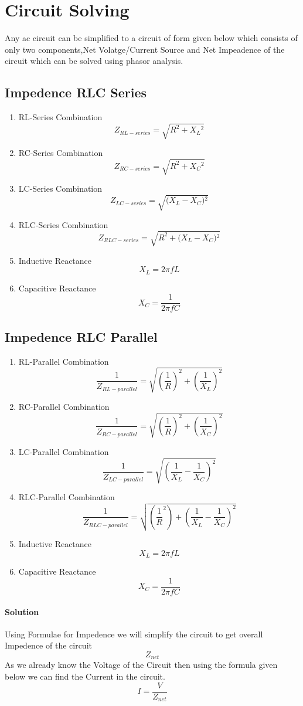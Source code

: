 \documentclass[12pt]{extarticle}
\begin{document}
\section{Circuit Solving}

Any ac circuit can be simplified to a circuit of form given below which consists of only two components,Net Volatge/Current Source and Net Impeadence of the circuit which can be solved using phasor analysis.
\subsection{Impedence RLC Series}
\begin{enumerate}
\item RL-Series Combination$$Z_{RL-series}=\sqrt{R^{2}+X{_{L}}{^{2}}} $$
\item RC-Series Combination$$Z_{RC-series}=\sqrt{R^{2}+X{_{C}}{^{2}}} $$
\item LC-Series Combination$$Z_{LC-series}=\sqrt{{(X_{L}-X{_{C})}}{^{2}}} $$
\item RLC-Series Combination$$Z_{RLC-series}=\sqrt{R^{2}+{(X_{L}-X{_{C})}}{^{2}}} $$
\item Inductive Reactance $$X_{L}=2\pi fL$$
\item Capacitive Reactance $$X_{C}=\frac{1}{2\pi fC}$$
\end{enumerate}
\subsection{Impedence RLC Parallel}
\begin{enumerate}
\item RL-Parallel Combination$$\frac{1}{Z_{RL-parallel}}=\sqrt{\left(\frac{1}{R}\right)^{2}+\left(\frac{1}{X_{L}}\right)^{2}} $$
\item RC-Parallel Combination$$\frac{1}{Z_{RC-parallel}}=\sqrt{\left(\frac{1}{R}\right)^{2}+\left(\frac{1}{X_{C}}\right)^{2}} $$
\item LC-Parallel Combination$$\frac{1}{Z_{LC-parallel}}=\sqrt{\left({{\frac{1}{X_{L}}}-{\frac{1}{X_{C}}}}\right)^{2}} $$
\item RLC-Parallel Combination$$\frac{1}{Z_{RLC-parallel}}=\sqrt{{\left({\frac{1}{R}}^{2}\right)}+\left({{\frac{1}{X_{L}}}-{\frac{1}{X_{C}}}}\right)^{2}} $$
\item Inductive Reactance $$X_{L}=2\pi fL$$
\item Capacitive Reactance $$X_{C}=\frac{1}{2\pi fC}$$
\end{enumerate}
\paragraph{Solution}
Using Formulae for Impedence we will simplify the circuit to get overall Impedence of the circuit$$Z_{net}$$ As we already know the Voltage of the Circuit then using the formula given below we can find the Current in the circuit.
$$I=\frac{V}{Z_{net}}$$
\end{document}
